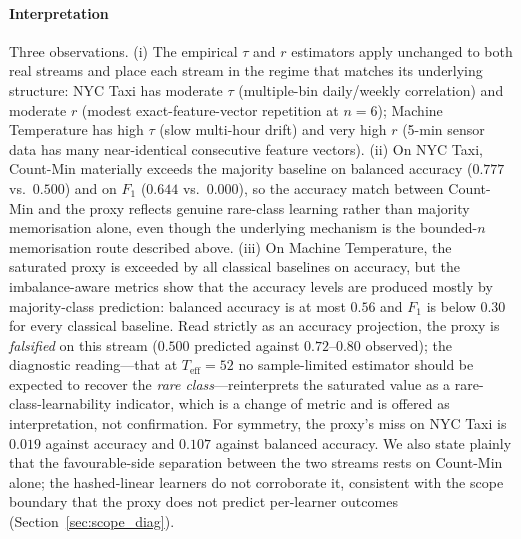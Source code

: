 \documentclass[sensors,article,submit,pdftex,moreauthors]{Definitions/mdpi}
\newcommand{\Teff}{T_{\mathrm{eff}}}
\providecommand{\DIFadd}[1]{{\protect\color{blue}#1}} %
\providecommand{\DIFdel}[1]{} %
\providecommand{\DIFaddbegin}{} %
\providecommand{\DIFaddend}{} %
\providecommand{\DIFdelbegin}{} %
\providecommand{\DIFdelend}{} %
\begin{document}
\paragraph{Interpretation} Three observations.
(i) The empirical $\tau$ and $r$ estimators apply unchanged to both real streams and place each stream in the regime that matches its underlying structure: NYC Taxi has moderate $\tau$ (multiple-bin daily/weekly correlation) and moderate $r$ (modest exact-feature-vector repetition at $n = 6$); Machine Temperature has high $\tau$ (slow multi-hour drift) and very high $r$ (5-min sensor data has many near-identical consecutive feature vectors).
(ii) On NYC Taxi, Count-Min materially exceeds the majority baseline on balanced accuracy ($0.777$ vs.\ $0.500$) and on $F_1$ ($0.644$ vs.\ $0.000$), so the accuracy match between Count-Min and the proxy reflects genuine rare-class learning rather than majority memorisation alone, even though the underlying mechanism is the bounded-$n$ memorisation route described above.
(iii) On Machine Temperature, the saturated proxy is exceeded by all classical baselines on accuracy, but the imbalance-aware metrics show that the \DIFdelbegin \DIFdel{gap is mostly }\DIFdelend \DIFaddbegin \DIFadd{accuracy levels are produced mostly by }\DIFaddend majority-class \DIFdelbegin \DIFdel{memorisation}\DIFdelend \DIFaddbegin \DIFadd{prediction}\DIFaddend : balanced accuracy is at most $0.56$ and $F_1$ is below $0.30$ for every classical baseline. \DIFdelbegin \DIFdel{This is the expected diagnostic behaviour }\DIFdelend \DIFaddbegin \DIFadd{Read strictly as an accuracy projection, the proxy is }\emph{\DIFadd{falsified}} \DIFadd{on this stream ($0.500$ predicted against $0.72$--$0.80$ observed); the diagnostic reading---that }\DIFaddend at $\Teff = 52$ \DIFdelbegin \DIFdel{---}\DIFdelend no sample-limited estimator should be expected to recover the \DIFdelbegin \DIFdel{rare class at this effective sample count---and we treat it as a genuine negative case. }\DIFdelend \DIFaddbegin \emph{\DIFadd{rare class}}\DIFadd{---reinterprets the saturated value as a rare-class-learnability indicator, which is a change of metric and is offered as interpretation, not confirmation. For symmetry, the proxy's miss on NYC Taxi is $0.019$ against accuracy and $0.107$ against balanced accuracy. We also state plainly that the favourable-side separation between the two streams rests on Count-Min alone; the hashed-linear learners do not corroborate it, consistent with the scope boundary that the proxy does not predict per-learner outcomes (Section~\ref{sec:scope_diag}).
}\DIFaddend 
\end{document}
